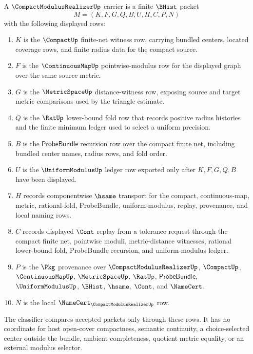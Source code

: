 \begin{definition}
\label{def:compact-modulus-realizer-carrier}
A $\CompactModulusRealizerUp$ carrier is a finite $\BHist$ packet
$$
M=(K,F,G,Q,B,U,H,C,P,N)
$$
with the following displayed rows:
\begin{enumerate}
\item $K$ is the $\CompactUp$ finite-net witness row, carrying bundled centers, located coverage rows, and finite radius data for the compact source.
\item $F$ is the $\ContinuousMapUp$ pointwise-modulus row for the displayed graph over the same source metric.
\item $G$ is the $\MetricSpaceUp$ distance-witness row, exposing source and target metric comparisons used by the triangle estimate.
\item $Q$ is the $\RatUp$ lower-bound fold row that records positive radius histories and the finite minimum ledger used to select a uniform precision.
\item $B$ is the $\mathsf{ProbeBundle}$ recursion row over the compact finite net, including bundled center names, radius rows, and fold order.
\item $U$ is the $\UniformModulusUp$ ledger row exported only after $K,F,G,Q,B$ have been displayed.
\item $H$ records componentwise $\hsame$ transport for the compact, continuous-map, metric, rational-fold, ProbeBundle, uniform-modulus, replay, provenance, and local naming rows.
\item $C$ records displayed $\Cont$ replay from a tolerance request through the compact finite net, pointwise moduli, metric-distance witnesses, rational lower-bound fold, ProbeBundle recursion, and uniform-modulus ledger.
\item $P$ is the $\Pkg$ provenance over $\CompactModulusRealizerUp$, $\CompactUp$, $\ContinuousMapUp$, $\MetricSpaceUp$, $\RatUp$, $\mathsf{ProbeBundle}$, $\UniformModulusUp$, $\BHist$, $\hsame$, $\Cont$, and $\NameCert$.
\item $N$ is the local $\NameCert_{\CompactModulusRealizerUp}$ row.
\end{enumerate}
The classifier compares accepted packets only through these rows. It has no coordinate for host open-cover compactness, semantic continuity, a choice-selected center outside the bundle, ambient completeness, quotient metric equality, or an external modulus selector.
\end{definition}

